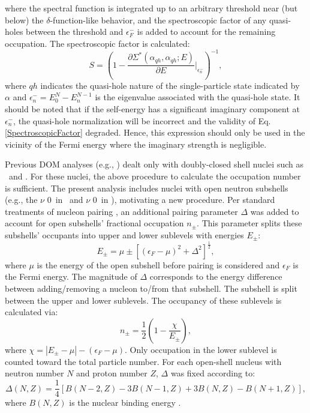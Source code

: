 where the spectral function is integrated up to an arbitrary threshold near (but below) the
$\delta$-function-like behavior, and the spectroscopic factor of any quasi-holes between the threshold and
$\epsilon_{F}^{-}$ is added to account for the remaining occupation. The spectroscopic factor is
calculated:
\begin{equation} \label{SpectroscopicFactor}
    S = \left(1-\frac{\partial\Sigma^{*}(\alpha_{qh},\alpha_{qh};E)}
    {\partial{E}}\bigg\rvert_{\epsilon_{n}^{-}}\right)^{-1},
\end{equation}
where $qh$ indicates the quasi-hole nature of the single-particle state indicated
by $\alpha$ and $\epsilon_{n}^{-} = E_{0}^{N}-E_{n}^{N-1}$ is the
eigenvalue associated with the quasi-hole state. It should be noted that if the
self-energy has a significant imaginary component at $\epsilon_{n}^{-}$, the
quasi-hole normalization will be incorrect and the validity of Eq.
\ref{SpectroscopicFactor} degraded. Hence, this expression should only be used
in the vicinity of the Fermi energy where the imaginary strength is negligible.

Previous DOM analyses (e.g., \cite{MahzoonPhDThesis}) dealt only with doubly-closed 
shell nuclei such as \caForty\ and \caEight.
For these nuclei, the above procedure to calculate the occupation number is
sufficient. The present analysis includes nuclei with open neutron subshells
(e.g., the $\nu$ 0\dFive\ in \oEight\ and $\nu$ 0\fFive\ in \niEight)\footnotemark, motivating a new
procedure. Per standard treatments of nucleon pairing \cite{BohrAndMottelson}, an additional
pairing parameter $\Delta$ was added to account for open subshells' fractional occupation $n_{\pm}$.
This parameter splits these subshells' occupants into upper and lower sublevels with energies 
$E_{\pm}$:
\begin{equation}
    E_{\pm} = \mu \pm [(\epsilon_{F}-\mu)^{2} + \Delta^{2}]^{\frac{1}{2}},
\end{equation}
where $\mu$ is the energy of the open subshell before pairing is considered and
$\epsilon_{F}$ is the Fermi
energy. The magnitude of $\Delta$ corresponds to the energy difference between
adding/removing a nucleon to/from that subshell. The subshell
is split between the upper and lower sublevels. The occupancy of these sublevels is calculated via:
\begin{equation}
    n_{\pm} = \frac{1}{2}\left( 1-\frac{\chi}{E_{\pm}}\right),
\end{equation}
where $\chi = |E_{\pm}-\mu| - (\epsilon_{F} - \mu)$. Only occupation in the
lower sublevel is counted toward the total particle number. For each open-shell
nucleus with neutron number $N$ and proton number $Z$, $\Delta$ was fixed according to:
\begin{equation}
    \Delta(N,Z) = \frac{1}{4}\left[B(N-2,Z)-3B(N-1,Z) + 3B(N,Z)-B(N+1,Z)\right],
\end{equation}
where $B(N,Z)$ is the nuclear binding energy \cite{BohrAndMottelson}.


